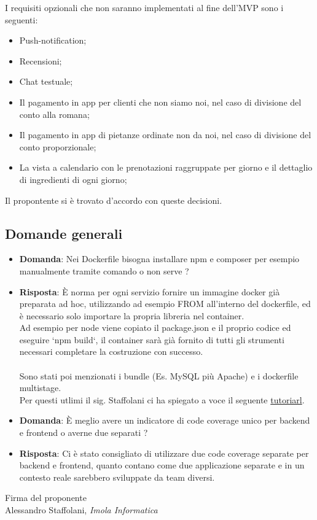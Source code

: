 \documentclass[a4paper, 11pt]{article}
\begin{document}
I requisiti opzionali che non saranno implementati al fine dell'MVP sono i seguenti:

\begin{itemize}
\item Push-notification;
\item Recensioni;
\item Chat testuale;
\item Il pagamento in app per clienti che non siamo noi, nel caso di divisione del conto alla romana;
\item Il pagamento in app di pietanze ordinate non da noi, nel caso di divisione del conto proporzionale;
\item La vista a calendario con le prenotazioni raggruppate per giorno e il dettaglio di ingredienti di ogni giorno;
\end{itemize}

Il propontente si è trovato d'accordo con queste decisioni.

\subsection{Domande generali}

\begin{itemize}
\item \textbf{Domanda}: Nei Dockerfile bisogna installare npm e composer per esempio manualmente tramite comando o non serve ?%
\item \textbf{Risposta}: È norma per ogni servizio fornire un immagine docker già preparata ad hoc, utilizzando ad esempio FROM all'interno del dockerfile, ed è necessario solo importare la propria libreria nel container. \\ Ad esempio per node viene copiato il package.json e il proprio codice ed eseguire `npm build`, il container sarà già fornito di tutti gli strumenti necessari completare la costruzione con successo. \\ \\ Sono stati poi menzionati i bundle (Es. MySQL più Apache) e i dockerfile multistage. \\ Per questi utlimi il sig. Staffolani ci ha spiegato a voce il seguente \href{https://medium.com/@mohamedbenkhemiswork576/how-to-dockerize-a-react-app-with-multi-stage-build-and-nginx-minimize-react-image-size-by-80-33a09ae20118}{tutoriarl}.
\end{itemize}

\begin{itemize}
\item \textbf{Domanda}: È meglio avere un indicatore di code coverage unico per backend e frontend o averne due separati ?%
\item \textbf{Risposta}: Ci è stato consigliato di utilizzare due code coverage separate per backend e frontend, quanto contano come due applicazione separate e in un contesto reale sarebbero sviluppate da team diversi.
\end{itemize}

\vspace{60pt}
\begin{flushleft}
\hfill Firma del proponente \\
\vspace{50pt}
\hfill Alessandro Staffolani, \textit{Imola Informatica}
\end{flushleft}
\end{document}
